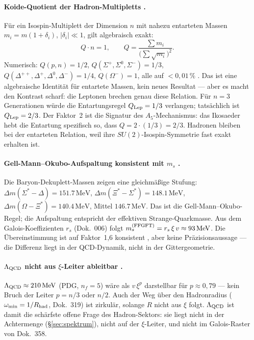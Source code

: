 \paragraph{Koide-Quotient der Hadron-Multipletts \BM.}
Für ein Isospin-Multiplett der Dimension $n$ mit nahezu entarteten Massen
$m_i = m(1+\delta_i)$, $|\delta_i|\ll1$, gilt algebraisch exakt:
\[
  Q \cdot n = 1, \qquad Q = \frac{\sum m_i}{\bigl(\sum\sqrt{m_i}\bigr)^2}.
\]
Numerisch: $Q(p,n) = 1/2$, $Q(\Sigma^+,\Sigma^0,\Sigma^-) = 1/3$,
$Q(\Delta^{++},\Delta^+,\Delta^0,\Delta^-) = 1/4$, $Q(\Omega^-) = 1$,
alle auf $< 0{,}01\,\%$ \BM. Das ist eine algebraische Identität für
entartete Massen, kein neues Resultat --- aber es macht den Kontrast scharf:
die Leptonen brechen genau diese Relation. Für $n = 3$ Generationen würde
die Entartungsregel $Q_{\rm Lep} = 1/3$ verlangen; tatsächlich ist
$Q_{\rm Lep} = 2/3$. Der Faktor~2 ist die Signatur des $A_5$-Mechanismus:
das Ikosaeder hebt die Entartung spezifisch so, dass $Q = 2\cdot(1/3) = 2/3$.
Hadronen bleiben bei der entarteten Relation, weil ihre
$SU(2)$-Isospin-Symmetrie fast exakt erhalten ist.

\paragraph{Gell-Mann--Okubo-Aufspaltung konsistent mit $m_s$ \KM.}
Die Baryon-Dekuplett-Massen zeigen eine gleichmäßige Stufung:
$\Delta m(\Sigma^*{-}\Delta) = 151.7\,\text{MeV}$,
$\Delta m(\Xi^*{-}\Sigma^*) = 148.1\,\text{MeV}$,
$\Delta m(\Omega{-}\Xi^*) = 140.4\,\text{MeV}$, Mittel $146.7\,\text{MeV}$.
Das ist die Gell-Mann--Okubo-Regel; die Aufspaltung entspricht der effektiven
Strange-Quarkmasse. Aus dem Galois-Koeffizienten $r_s$ (Dok.~006) folgt
$m_s^{(\rm FFGFT)} = r_s\,\xi\,v \approx 93\,\text{MeV}$. Die Übereinstimmung
ist auf Faktor~1{,}6 konsistent \KM, aber keine Präzisionsaussage --- die
Differenz liegt in der QCD-Dynamik, nicht in der Gittergeometrie.

\paragraph{$\Lambda_{\rm QCD}$ nicht aus $\xi$-Leiter ableitbar \XM.}
$\Lambda_{\rm QCD} \approx 210\,\text{MeV}$ (PDG, $n_f = 5$) wäre als
$v\,\xi^p$ darstellbar für $p \approx 0{,}79$ --- kein Bruch der Leiter
$p = n/3$ oder $n/2$. Auch der Weg über den Hadronradius
($\omega_{\min} = 1/R_{\rm had}$, Dok.~319) ist zirkulär, solange $R$ nicht
aus $\xi$ folgt. $\Lambda_{\rm QCD}$ ist damit die schärfste offene Frage des
Hadron-Sektors: sie liegt nicht in der Achtermenge (§\ref{sec:spektrum}),
nicht auf der $\xi$-Leiter, und nicht im Galois-Raster von Dok.~358.

